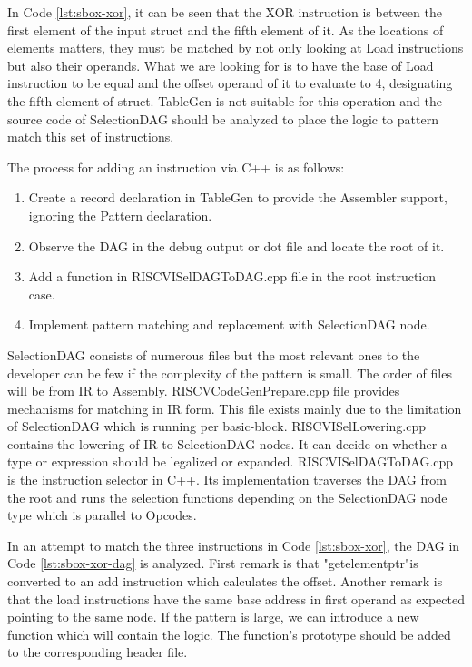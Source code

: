 In Code \ref{lst:sbox-xor}, it can be seen that the XOR instruction is between the first element of the input struct and the fifth element of it. As the locations of elements matters, they must be matched by not only looking at Load instructions but also their operands. What we are looking for is to have the base of Load instruction to be equal and the offset operand of it to evaluate to 4, designating the fifth element of struct. TableGen is not suitable for this operation and the source code of SelectionDAG should be analyzed to place the logic to pattern match this set of instructions.

The process for adding an instruction via C++ is as follows:
\begin{enumerate}
    \item Create a record declaration in TableGen to provide the Assembler support, ignoring the Pattern declaration.
    \item Observe the DAG in the debug output or dot file and locate the root of it. 
    \item Add a function in RISCVISelDAGToDAG.cpp file in the root instruction case. 
    \item Implement pattern matching and replacement with SelectionDAG node.
\end{enumerate}

SelectionDAG consists of numerous files but the most relevant ones to the developer can be few if the complexity of the pattern is small. The order of files will be from IR to Assembly. RISCVCodeGenPrepare.cpp file provides mechanisms for matching in IR form. This file exists mainly due to the limitation of SelectionDAG which is running per basic-block. RISCVISelLowering.cpp contains the lowering of IR to SelectionDAG nodes. It can decide on whether a type or expression should be legalized or expanded. RISCVISelDAGToDAG.cpp is the instruction selector in C++. Its implementation traverses the DAG from the root and runs the selection functions depending on the SelectionDAG node type which is parallel to Opcodes. 




In an attempt to match the three instructions in Code \ref{lst:sbox-xor}, the DAG in Code \ref{lst:sbox-xor-dag} is analyzed. First remark is that "getelementptr"is converted to an add instruction which calculates the offset. Another remark is that the load instructions have the same base address in first operand as expected pointing to the same node. If the pattern is large, we can introduce a new function which will contain the logic. The function's prototype should be added to the corresponding header file.


